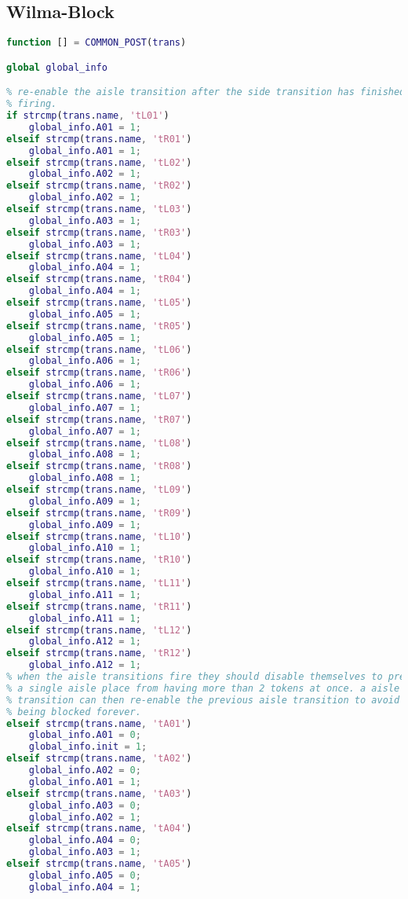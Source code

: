 \subsection{Wilma-Block}

\begin{lstlisting}[language=MATLAB, caption=COMMON\_POST.m]
function [] = COMMON_POST(trans)

global global_info

% re-enable the aisle transition after the side transition has finished
% firing. 
if strcmp(trans.name, 'tL01')
    global_info.A01 = 1;
elseif strcmp(trans.name, 'tR01')
    global_info.A01 = 1;
elseif strcmp(trans.name, 'tL02')
    global_info.A02 = 1;
elseif strcmp(trans.name, 'tR02')
    global_info.A02 = 1;
elseif strcmp(trans.name, 'tL03')
    global_info.A03 = 1;
elseif strcmp(trans.name, 'tR03')
    global_info.A03 = 1;
elseif strcmp(trans.name, 'tL04')
    global_info.A04 = 1;
elseif strcmp(trans.name, 'tR04')
    global_info.A04 = 1;
elseif strcmp(trans.name, 'tL05')
    global_info.A05 = 1;
elseif strcmp(trans.name, 'tR05')
    global_info.A05 = 1;
elseif strcmp(trans.name, 'tL06')
    global_info.A06 = 1;
elseif strcmp(trans.name, 'tR06')
    global_info.A06 = 1;
elseif strcmp(trans.name, 'tL07')
    global_info.A07 = 1;
elseif strcmp(trans.name, 'tR07')
    global_info.A07 = 1;
elseif strcmp(trans.name, 'tL08')
    global_info.A08 = 1;
elseif strcmp(trans.name, 'tR08')
    global_info.A08 = 1;
elseif strcmp(trans.name, 'tL09')
    global_info.A09 = 1;
elseif strcmp(trans.name, 'tR09')
    global_info.A09 = 1;
elseif strcmp(trans.name, 'tL10')
    global_info.A10 = 1;
elseif strcmp(trans.name, 'tR10')
    global_info.A10 = 1;
elseif strcmp(trans.name, 'tL11')
    global_info.A11 = 1;
elseif strcmp(trans.name, 'tR11')
    global_info.A11 = 1;
elseif strcmp(trans.name, 'tL12')
    global_info.A12 = 1;
elseif strcmp(trans.name, 'tR12')
    global_info.A12 = 1;
% when the aisle transitions fire they should disable themselves to prevent
% a single aisle place from having more than 2 tokens at once. a aisle
% transition can then re-enable the previous aisle transition to avoid it
% being blocked forever.
elseif strcmp(trans.name, 'tA01')
    global_info.A01 = 0;
    global_info.init = 1;
elseif strcmp(trans.name, 'tA02')
    global_info.A02 = 0;
    global_info.A01 = 1;
elseif strcmp(trans.name, 'tA03')
    global_info.A03 = 0;
    global_info.A02 = 1;
elseif strcmp(trans.name, 'tA04')
    global_info.A04 = 0;
    global_info.A03 = 1;
elseif strcmp(trans.name, 'tA05')
    global_info.A05 = 0;
    global_info.A04 = 1;

\end{lstlisting}
